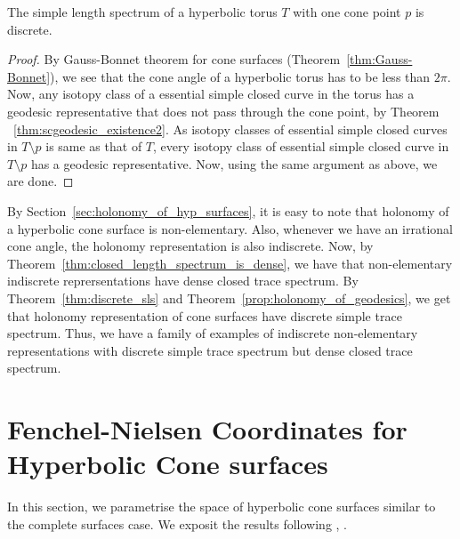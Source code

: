 \begin{theorem}\label{discrete_sls_for_torus}
	The simple length spectrum of a hyperbolic torus $T$ with one cone point $p$ is discrete.
\end{theorem}

\begin{proof}

By Gauss-Bonnet theorem for cone surfaces (Theorem~\ref{thm:Gauss-Bonnet}), we see that the cone angle of a hyperbolic torus has to be less than $2 \pi$. Now, any isotopy class of a essential simple closed curve in the torus has a geodesic representative that does not pass through the cone point, by Theorem ~\ref{thm:scgeodesic_existence2}. As isotopy classes of essential simple closed curves in $T \setminus p$ is same as that of $T$, every isotopy class of essential simple closed curve in $T \setminus p$ has a geodesic representative. Now, using the same argument as above, we are done. 
\end{proof}

\begin{remark}
	By Section~\ref{sec:holonomy_of_hyp_surfaces}, it is easy to note that holonomy of a hyperbolic cone surface is non-elementary. Also, whenever we have an irrational cone angle, the holonomy representation is also indiscrete. Now, by Theorem~\ref{thm:closed_length_spectrum_is_dense}, we have that non-elementary indiscrete reprersentations have dense closed trace spectrum. By Theorem~\ref{thm:discrete_sls} and Theorem~\ref{prop:holonomy_of_geodesics}, we get that holonomy representation of cone surfaces have discrete simple trace spectrum. Thus, we have a family of examples of indiscrete non-elementary representations with discrete simple trace spectrum but dense closed trace spectrum.
\end{remark}
\section{Fenchel-Nielsen Coordinates for Hyperbolic Cone surfaces}\label{sec:FNCoordinates}

In this section, we parametrise the space of hyperbolic cone surfaces similar to the complete surfaces case. We exposit the results following \cite{PB}, \cite{HuipingPan}. 


